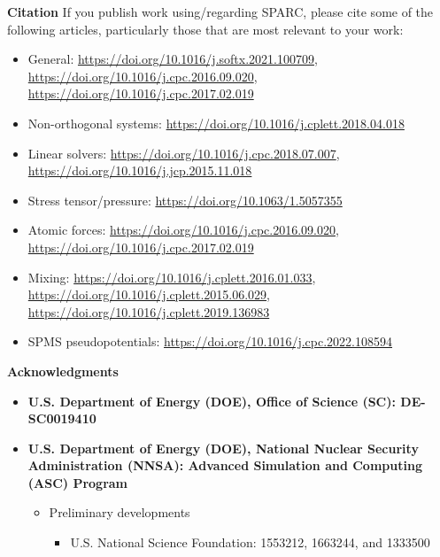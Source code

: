 \begin{frame}[allowframebreaks]{\textbf{Citation}} \label{Citation}
If you publish work using/regarding SPARC, please cite some of the following articles, particularly those that are most relevant to your work:
\begin{itemize}
    \item General: \url{https://doi.org/10.1016/j.softx.2021.100709}, \url{https://doi.org/10.1016/j.cpc.2016.09.020}, \url{https://doi.org/10.1016/j.cpc.2017.02.019}
    \item Non-orthogonal systems: \url{https://doi.org/10.1016/j.cplett.2018.04.018}
    \item Linear solvers: \url{https://doi.org/10.1016/j.cpc.2018.07.007},    \url{https://doi.org/10.1016/j.jcp.2015.11.018}
    \item Stress tensor/pressure: \url{https://doi.org/10.1063/1.5057355}
    \item Atomic forces: \url{https://doi.org/10.1016/j.cpc.2016.09.020}, \url{https://doi.org/10.1016/j.cpc.2017.02.019}
    \item Mixing: \url{https://doi.org/10.1016/j.cplett.2016.01.033}, \url{https://doi.org/10.1016/j.cplett.2015.06.029}, \url{https://doi.org/10.1016/j.cplett.2019.136983}
    \item SPMS pseudopotentials: \url{https://doi.org/10.1016/j.cpc.2022.108594}
\end{itemize}
\end{frame}
  
  
  \begin{frame}[allowframebreaks]{\textbf{Acknowledgments}} \label{Acknowledgments}
  
  \begin{itemize}
      \item \textbf{U.S. Department of Energy (DOE), Office of Science (SC): DE-SC0019410} \\
      \item \textbf{U.S. Department of Energy (DOE), National Nuclear Security Administration (NNSA): Advanced Simulation and Computing (ASC) Program} \\
      \vspace{10pt}
      \begin{itemize}
          \item Preliminary developments
          \begin{itemize}
              \item U.S. National Science Foundation: 1553212, 1663244, and 1333500
          \end{itemize}
      \end{itemize}
      
      
  \end{itemize}
  
  \end{frame}
  
